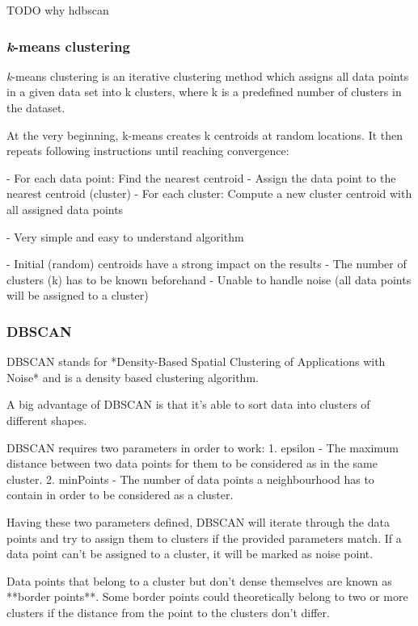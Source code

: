 TODO why hdbscan

\subsubsection{\textit{k}-means clustering}
\textit{k}-means clustering is an iterative clustering method which assigns all data points in a given data set
into k clusters, where k is a predefined number of clusters in the dataset.

At the very beginning, k-means creates k centroids at random locations.
It then repeats following instructions until reaching convergence:

- For each data point: Find the nearest centroid
- Assign the data point to the nearest centroid (cluster)
- For each cluster: Compute a new cluster centroid with all assigned data points

- Very simple and easy to understand algorithm

- Initial (random) centroids have a strong impact on the results
- The number of clusters (k) has to be known beforehand
- Unable to handle noise (all data points will be assigned to a cluster)

\subsubsection{DBSCAN}
DBSCAN stands for *Density-Based Spatial Clustering of Applications with Noise*
and is a density based clustering algorithm.

A big advantage of DBSCAN is that it's able to sort data into clusters
of different shapes.

DBSCAN requires two parameters in order to work:
1. epsilon - The maximum distance between two data points for them to be considered as in the same cluster.
2. minPoints - The number of data points a neighbourhood has to contain in order to be considered as a cluster.

Having these two parameters defined, DBSCAN will iterate through the data points
and try to assign them to clusters if the provided parameters match.
If a data point can't be assigned to a cluster, it will be marked as noise point.

Data points that belong to a cluster but don't dense themselves are known
as **border points**. Some border points could theoretically belong to two or more clusters
if the distance from the point to the clusters don't differ.

